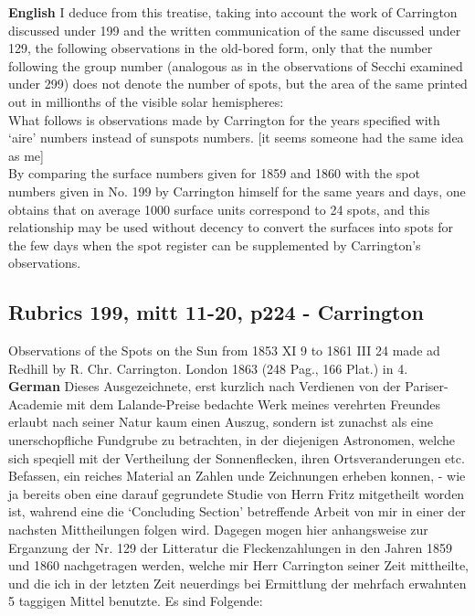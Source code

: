 \documentclass[12pt]{article}
\begin{document}
\textbf{English}
I deduce from this treatise, taking into account the work of Carrington discussed under 199 and the written communication of the same discussed under 129, the following observations in the old-bored form, only that the number following the group number (analogous as in the observations of Secchi examined under 299) does not denote the number of spots, but the area of the same printed out in millionths of the visible solar hemispheres:\\

What follows is observations made by Carrington for the years specified with `aire' numbers instead of sunspots numbers. [it seems someone had the same idea as me]\\

By comparing the surface numbers given for 1859 and 1860 with the spot numbers given in No. 199 by Carrington himself for the same years and days, one obtains that on average 1000 surface units correspond to 24 spots, and this relationship may be used without decency to convert the surfaces into spots for the few days when the spot register can be supplemented by Carrington's observations.

\subsection{Rubrics 199, mitt 11-20, p224 - Carrington}\label{mitt:rubrics 199}

Observations of the Spots on the Sun from 1853 XI 9 to 1861 III 24 made ad Redhill by R. Chr. Carrington. London 1863 (248 Pag., 166 Plat.) in 4.\\

\textbf{German} 
Dieses Ausgezeichnete, erst kurzlich nach Verdienen von der Pariser-Academie mit dem Lalande-Preise bedachte Werk meines verehrten Freundes erlaubt nach seiner Natur kaum einen Auszug, sondern ist zunachst als eine unerschopfliche Fundgrube zu betrachten, in der diejenigen Astronomen, welche sich speqiell mit der Vertheilung der Sonnenflecken, ihren Ortsveranderungen etc. Befassen, ein reiches Material an Zahlen unde Zeichnungen erheben konnen, - wie ja bereits oben eine darauf gegrundete Studie von Herrn Fritz mitgetheilt worden ist, wahrend eine die `Concluding Section' betreffende Arbeit von mir in einer der nachsten Mittheilungen folgen wird. Dagegen mogen hier anhangsweise zur Erganzung der Nr. 129 der Litteratur die Fleckenzahlungen in den Jahren 1859 und 1860 nachgetragen werden, welche mir Herr Carrington seiner Zeit mittheilte, und die ich in der letzten Zeit neuerdings bei Ermittlung der mehrfach erwahnten 5 taggigen Mittel benutzte. Es sind Folgende:\\
\end{document}
